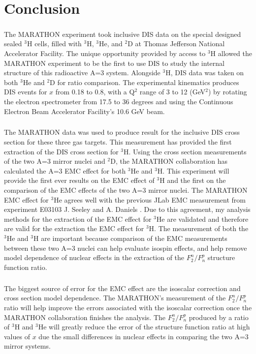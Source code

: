 
\chapter{Conclusion}
\paragraph{}The MARATHON experiment took inclusive DIS data on the special designed sealed $^3$H cells, filled with $^3$H, $^3$He, and $^2$D at Thomas Jefferson National Accelerator Facility. The unique opportunity provided by access to $^3$H allowed the MARATHON experiment to be the first to use DIS to study the internal structure of this radioactive A=3 system. Alongside $^3$H, DIS data was taken on both $^3$He and $^2$D for ratio comparison. The experimental kinematics produces DIS events for $x$ from 0.18 to 0.8, with a Q$^2$ range of 3 to 12 (GeV$^2$) by rotating the electron spectrometer from 17.5 to 36 degrees and using the Continuous Electron Beam Accelerator Facility's 10.6 GeV beam. 
\paragraph{}The MARATHON data was used to produce result for the inclusive DIS cross section for these three gas targets. This measurement has provided the first extraction of the DIS cross section for $^3$H. Using the cross section measurements of the two A=3 mirror nuclei and $^2$D, the MARATHON collaboration has calculated the A=3 EMC effect for both $^3$He and $^3$H. This experiment will provide the first ever results on the EMC effect of $^3$H and the first on the comparison of the EMC effects of the two A=3 mirror nuclei. The MARATHON EMC effect for $^3$He agrees well with the previous JLab EMC measurement from experiment E03103 J. Seeley and A. Daniels \cite{seeley}. Due to this agreement, my analysis methods for the extraction of the EMC effect for $^3$He are validated and therefore are valid for the extraction the EMC effect for $^3$H. The measurement of both the $^3$He and $^3$H are important because comparison of the EMC measurements between these two A=3 nuclei can help evaluate isospin effects, and help remove model dependence of nuclear effects in the extraction of the $F^n_2/F^p_n$ structure function ratio. 

\paragraph{}The biggest source of error for the EMC effect are the isoscalar correction and cross section model dependence. The MARATHON's measurement of the $F^n_2/F^p_n$ ratio will help improve the errors associated with the isoscalar correction once the MARATHON collaboration finishes the analysis. The $F^n_2/F^p_n$ produced by a ratio of $^3$H and $^3$He will greatly reduce the error of the structure function ratio at high values of $x$ due the small differences in nuclear effects in comparing the two A=3 mirror systems. 

